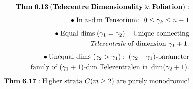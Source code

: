\documentclass[preview]{standalone}
\begin{document}
\begin{align*}
\special{dvisvgm:raw <g id='unique000'>}\mathbf{Thm\;6.13\;(Telecentre\;Dimensionality\;\&\;Foliation):}\\[4pt]\bullet\;\text{In }n\text{-dim Tensorium: }\; 0 \le \gamma_k \le n - 1\\[4pt]\bullet\;\text{Equal dims }(\gamma_1=\gamma_2):\;\text{Unique connecting}\\\;\;\textit{Telezentrale}\text{ of dimension }\gamma_1 + 1.\\[4pt]\bullet\;\text{Unequal dims }(\gamma_2 > \gamma_1):\;(\gamma_2-\gamma_1)\text{-parameter}\\\;\;\text{family of }(\gamma_1+1)\text{-dim Telezentralen in }\dim(\gamma_2+1).\\[5pt]\mathbf{Thm\;6.17:}\;\text{Higher strata }C(m\ge 2)\text{ are purely monodromic!}\special{dvisvgm:raw </g>}
\end{align*}
\end{document}
